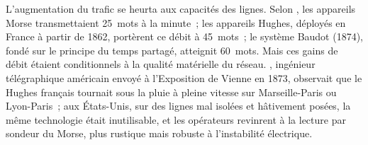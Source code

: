 L'augmentation du trafic se heurta aux capacités des lignes. Selon \textcite{beauchamp2001telegraphy}, les appareils Morse transmettaient 25~mots à la minute~; les appareils Hughes, déployés en France à partir de 1862, portèrent ce débit à 45~mots~; le système Baudot (1874), fondé sur le principe du temps partagé, atteignit 60~mots. Mais ces gains de débit étaient conditionnels à la qualité matérielle du réseau. \textcite{brooks_report_1875}, ingénieur télégraphique américain envoyé à l'Exposition de Vienne en 1873, observait que le Hughes français tournait sous la pluie à pleine vitesse sur Marseille-Paris ou Lyon-Paris~; aux États-Unis, sur des lignes mal isolées et hâtivement posées, la même technologie était inutilisable, et les opérateurs revinrent à la lecture par sondeur du Morse, plus rustique mais robuste à l'instabilité électrique. %
